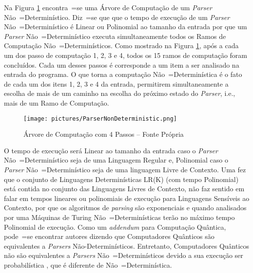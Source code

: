 {    Na Figura \ref{fig:pictures/ParserNonDeterministic.png} encontra~=se uma
    Árvore de Computação de um \textit{Parser} Não~=Determinístico.
    Diz~=se que que o tempo de execução de um \textit{Parser} Não~=Determinístico é Linear ou
    Polinomial ao tamanho da entrada por que um \textit{Parser} Não~=Determinístico
    executa simultaneamente todos os Ramos de Computação Não~=Determinísticos.
    Como mostrado na Figura \ref{fig:pictures/ParserNonDeterministic.png},
    após a cada um dos passo de computação 1,
    2, 3 e 4,
    todos os 15 ramos de computação foram concluídos.
    Cada um desses passos é corresponde a um item a ser analisado na entrada do programa.
    O que torna a computação Não~=Determinística é o fato de cada um dos itens 1,
    2, 3 e 4 da entrada,
    permitirem simultaneamente a escolha de mais de um caminho
    na escolha do próximo estado do \textit{Parser},
    i.e.,
    mais de um Ramo de Computação.
    \begin{figure}[H]
    \centering
    \texttt{[image: pictures/ParserNonDeterministic.png]}
    \caption{Árvore de Computação com 4 Passos -- Fonte Própria}
    \label{fig:pictures/ParserNonDeterministic.png}
    \end{figure}

    O tempo de execução será Linear ao tamanho da entrada caso o
    \textit{Parser} Não~=Determinístico seja de uma Linguagem Regular e,
    Polinomial caso o \textit{Parser} Não~=Determinístico seja de uma linguagem Livre de Contexto.
    Uma fez que o conjunto de Linguagens Determinísticas LR(K) (com tempo
    Polinomial) está contida no conjunto das Linguagens Livres de Contexto,
    não faz sentido em falar em tempos lineares ou polinomiais
    de execução para Linguagens Sensíveis ao Contexto,
    por que os algoritmos de \textit{parsing} são exponenciais e
    quando analisados por uma Máquinas de Turing Não~=Determinísticas
    terão no máximo tempo Polinomial de execução.
    Como um \textit{addendum} para Computação Quântica,
    pode~=se encontrar autores dizendo que Computadores Quânticos
    são equivalentes a \textit{Parsers} Não-Determinísticos.
    Entretanto,
    Computadores Quânticos não são equivalentes a \textit{Parsers}
    Não~=Determinísticos devido a sua execução ser probabilística
    \cite{polynomialQuantumComputers},
    que é diferente de Não~=Determinística.

}
